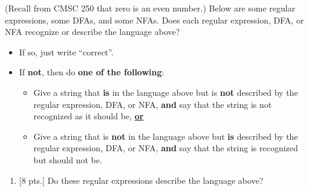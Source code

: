 \documentclass[11pt]{article}
\begin{document}
\begin{enumerate}
\begin{centering}
          \end{centering}

          \smallskip

          (Recall from CMSC 250 that zero is an even number.)  Below are
          some regular expressions, some DFAs, and some NFAs.  Does each
          regular expression, DFA, or NFA recognize or describe the language
          above?

          \vspace{-2.5mm}

          \begin{itemize}

            \addtolength{\itemsep}{0mm}

            \item If so, just write ``correct''.

            \item If \textbf{not}, then do \textbf{one of the following}:

                  \begin{itemize}

                    \addtolength{\itemsep}{.75mm}

                    \item Give a string that \textbf{is} in the language
                          above but is \textbf{not} described by the regular
                          expression, DFA, or NFA, \textbf{and} say that the
                          string is not recognized as it should be,
                          \textbf{\underline{or}}

                    \item Give a string that is \textbf{not} in the language
                          above but \textbf{is} described by the regular
                          expression, DFA, or NFA, \textbf{and} say that the
                          string is recognized but should not be.

                  \end{itemize}

          \end{itemize}

          \vspace{-2.5mm}

          \begin{enumerate}

            \addtolength{\itemsep}{30mm}

            \item {{[8 pts.]}} Do these regular expressions describe the
                  language above?


\end{enumerate}
\end{enumerate}
\end{document}
